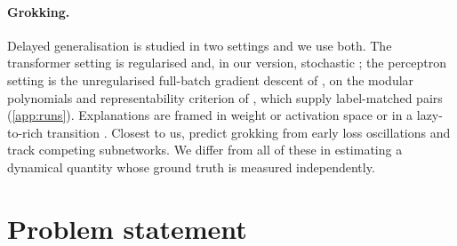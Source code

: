 \documentclass{article}
\begin{document}
\paragraph{Grokking.} Delayed generalisation \citep{power2022grokking} is studied in two settings
and we use both. The transformer setting is regularised and, in our version, stochastic
\citep{nanda2023progress, liu2022omnigrok}; the perceptron setting is the unregularised
full-batch gradient descent of \citet{gromov2023grokking}, on the modular polynomials and
representability criterion of \citet{doshi2024grokking}, which supply label-matched pairs
(\cref{app:runs}). Explanations are framed in weight or activation space
\citep{nanda2023progress, varma2023explaining, liu2022towards, barak2022hidden} or in a
lazy-to-rich transition \citep{kumar2024grokking}. Closest to us, \citet{notsawo2023predicting}
predict grokking from early loss oscillations \citep{thilak2022slingshot} and
\citet{merrill2023tale} track competing subnetworks. We differ from all of these in estimating a
dynamical quantity whose ground truth is measured independently.

\section{Problem statement}\label{sec:problem}
\end{document}
